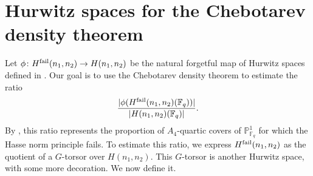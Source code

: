 \documentclass{amsart}
\numberwithin{equation}{section} \numberwithin{figure}{section}
\newcommand\FF{\mathbb{F}}
\newcommand\PP{\mathbb{P}}
\theoremstyle{one}
\theoremstyle{definition}
\begin{document}
\section{Hurwitz spaces for the Chebotarev density theorem}\label{sec:morehurwitz} 
Let \(\phi \colon H^{\rm fail}(n_1,n_2) \to H(n_1,n_2)\) be the natural forgetful map of Hurwitz spaces defined in .
Our goal is to use the Chebotarev density theorem to estimate the ratio
\[ \frac{|\phi(H^{\rm fail}(n_1,n_2)(\FF_q))|}{|H(n_1,n_2)(\FF_q)|}. \]
By , this ratio represents the proportion 
of \(A_4\)-quartic covers of \(\PP^1_{\FF_q}\) for which the Hasse norm principle fails.
To estimate this ratio, we express \(H^{\rm fail}(n_1,n_2)\) as the quotient of a \(G\)-torsor over \(H(n_1,n_2)\).
This \(G\)-torsor is another Hurwitz space, with some more decoration.
We now define it.
\end{document}
